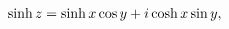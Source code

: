 \[\mathop{\sinh\/}\nolimits z=\mathop{\sinh\/}\nolimits x\mathop{\cos\/}%
\nolimits y+i\mathop{\cosh\/}\nolimits x\mathop{\sin\/}\nolimits y,\]